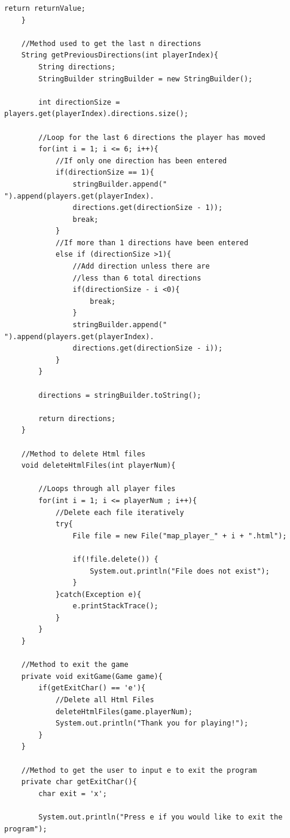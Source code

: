 \documentclass[a4paper,12pt]{extarticle}
\begin{document}
\begin{lstlisting}[caption=The initial code of the Game class, label=amb]
        return returnValue;
    }

    //Method used to get the last n directions
    String getPreviousDirections(int playerIndex){
        String directions;
        StringBuilder stringBuilder = new StringBuilder();

        int directionSize = players.get(playerIndex).directions.size();

        //Loop for the last 6 directions the player has moved
        for(int i = 1; i <= 6; i++){
            //If only one direction has been entered
            if(directionSize == 1){
                stringBuilder.append(" ").append(players.get(playerIndex).
                directions.get(directionSize - 1));
                break;
            }
            //If more than 1 directions have been entered
            else if (directionSize >1){
                //Add direction unless there are 
                //less than 6 total directions
                if(directionSize - i <0){
                    break;
                }
                stringBuilder.append(" ").append(players.get(playerIndex).
                directions.get(directionSize - i));
            }
        }

        directions = stringBuilder.toString();

        return directions;
    }

    //Method to delete Html files
    void deleteHtmlFiles(int playerNum){

        //Loops through all player files
        for(int i = 1; i <= playerNum ; i++){
            //Delete each file iteratively
            try{
                File file = new File("map_player_" + i + ".html");

                if(!file.delete()) {
                    System.out.println("File does not exist");
                }
            }catch(Exception e){
                e.printStackTrace();
            }
        }
    }

    //Method to exit the game
    private void exitGame(Game game){
        if(getExitChar() == 'e'){
            //Delete all Html Files
            deleteHtmlFiles(game.playerNum);
            System.out.println("Thank you for playing!");
        }
    }

    //Method to get the user to input e to exit the program
    private char getExitChar(){
        char exit = 'x';

        System.out.println("Press e if you would like to exit the program");


\end{lstlisting}
\end{document}

